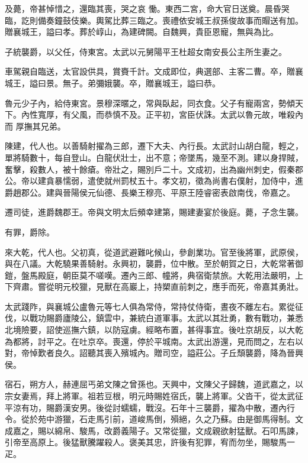 \begin{pinyinscope}
 及薨，帝甚悼惜之，還臨其喪，哭之哀
 慟。東西二宮，命大官日送奠。晨昏哭臨，訖則備奏鐘鼓伎樂。輿駕比葬三臨之。喪禮依安城王叔孫俊故事而賵送有加。贈襄城王，謚曰孝。葬於崞山，為建碑闕。自魏興，貴臣恩寵，無與為比。



 子統襲爵，以父任，侍東宮。太武以元舅陽平王杜超女南安長公主所生妻之。



 車駕親自臨送，太官設供具，賞賚千計。文成即位，典選部、主客二曹。卒，贈襄城王，謚曰景。無子。弟彌娥襲。卒，贈襄城王，謚曰恭。



 魯元少子內，給侍東宮。景穆深暱之，常與臥起，同衣食。父子有寵兩宮，勢傾天下。內性寬厚，有父風，而恭慎不及。正平初，宮臣伏誅。太武以魯元故，唯殺內而
 厚撫其兄弟。



 陳建，代人也。以善騎射擢為三郎，遷下大夫、內行長。太武討山胡白龍，輕之，單將騎數十，每自登山。白龍伏壯士，出不意；帝墜馬，幾至不測。建以身捍賊，奮擊，殺數人，被十餘瘡。帝壯之，賜別戶二十。文成初，出為幽州刺史，假秦郡公。帝以建貪暴懦弱，遣使就州罰杖五十。孝文初，徵為尚書右僕射，加侍中，進爵趙郡公。建與晉陽侯元仙德、長樂王穆亮、平原王陸睿密表啟南伐，帝嘉之。



 遷司徒，進爵魏郡王。帝與文明太后頻幸建第，賜建妻宴於後庭。薨，子念生襲。



 有罪，爵除。



 來大乾，代人也。父初真，從道武避難叱候山，參創業功。官至後將軍，武原侯，與在八議。大乾驍果善騎射。永興初，襲爵，位中散。至於朝賀之日，大乾常著御鎧，盤馬殿庭，朝臣莫不嗟嘆。遷內三郎、幢將，典宿衛禁旅。大乾用法嚴明，上下齊肅。嘗從明元校獵，見獸在高巖上，持槊直前刺之，應手而死，帝嘉其勇壯。



 太武踐阼，與襄城公盧魯元等七人俱為常侍，常持仗侍衛，晝夜不離左右。累從征伐，以戰功賜爵廬陵公，鎮雲中，兼統白道軍事。太武以其壯勇，數有戰功，兼悉北境險要，詔使巡撫六鎮，以防寇虜。經略布置，甚得事宜。後吐京胡反，以大乾
 為都將，討平之。在吐京卒。喪還，停於平城南。太武出游還，見而問之，左右以對，帝悼歎者良久。詔聽其喪入殯城內。贈司空，謚莊公。子丘頹襲爵，降為晉興侯。



 宿石，朔方人，赫連屈丐弟文陳之曾孫也。天興中，文陳父子歸魏，道武嘉之，以宗女妻焉，拜上將軍。祖若豆根，明元時賜姓宿氏，襲上將軍。父沓干，從太武征平涼有功，賜爵漢安男。後從討蠕蠕，戰沒。石年十三襲爵，擢為中散，遷內行令。從於苑中游獵，石走馬引前，道峻馬倒，殞絕，久之乃蘇。由是御馬得制。文成嘉之，賜以綿帛、駿馬，改爵義陽子。又常從獵，文成親欲射猛獸。石叩馬諫，
 引帝至高原上。後猛獸騰躍殺人。褒美其忠，許後有犯罪，宥而勿坐，賜駿馬一疋。




\end{pinyinscope}
